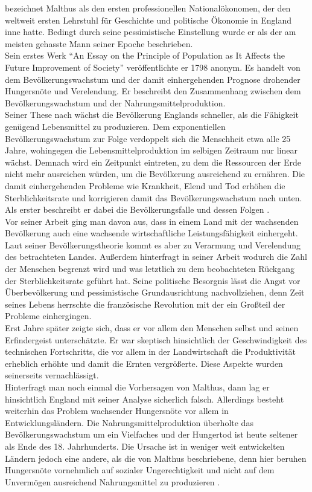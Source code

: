 \cite{Lin.2007} bezeichnet Malthus als den ersten professionellen Nationalökonomen, der den weltweit ersten Lehrstuhl für Geschichte und politische Ökonomie in England inne hatte. Bedingt durch seine pessimistische Einstellung wurde er als der am meisten gehasste Mann seiner Epoche beschrieben. \\
%
Sein erstes Werk "`An Essay on the Principle of Population as It Affects the Future Improvement of Society"' veröffentlichte er 1798 anonym. Es handelt von dem Bevölkerungswachstum und der damit einhergehenden Prognose drohender Hungersnöte und Verelendung. Er beschreibt den Zusammenhang zwischen dem Bevölkerungswachstum und der Nahrungsmittelproduktion.\\
%
Seiner These nach wächst die Bevölkerung Englands schneller, als die Fähigkeit genügend Lebensmittel zu produzieren. Dem exponentiellen Bevölkerungswachstum zur Folge verdoppelt sich die Menschheit etwa alle 25 Jahre, wohingegen die Lebensmittelproduktion im selbigen Zeitraum nur linear wächst. Demnach wird ein Zeitpunkt eintreten, zu dem die Ressourcen der Erde nicht mehr ausreichen würden, um die Bevölkerung ausreichend zu ernähren. Die damit einhergehenden Probleme wie Krankheit, Elend und Tod erhöhen die Sterblichkeitsrate und korrigieren damit das Bevölkerungswachstum nach unten. Als erster beschreibt er dabei die Bevölkerungsfalle und dessen Folgen \cite{Malthus.1798}. \\

Vor seiner Arbeit ging man davon aus, dass in einem Land mit der wachsenden Bevölkerung auch eine wachsende wirtschaftliche Leistungsfähigkeit einhergeht. Laut seiner Bevölkerungstheorie kommt es aber zu Verarmung und Verelendung des betrachteten Landes. Außerdem hinterfragt \cite{Malthus.1798} in seiner Arbeit wodurch die Zahl der Menschen begrenzt wird und was letztlich zu dem beobachteten Rückgang der Sterblichkeitsrate geführt hat. Seine politische Besorgnis lässt die Angst vor Überbevölkerung und pessimistische Grundausrichtung nachvollziehen, denn Zeit seines Lebens herrschte die französische Revolution mit der ein Großteil der Probleme einhergingen.\\
%
 Erst Jahre später zeigte sich, dass er vor allem den Menschen selbst und seinen Erfindergeist unterschätzte. Er war skeptisch hinsichtlich der Geschwindigkeit des technischen Fortschritts, die vor allem in der Landwirtschaft die Produktivität erheblich erhöhte und damit die Ernten vergrößerte. Diese Aspekte wurden seinerseits vernachlässigt. \\
%
 Hinterfragt man noch einmal die Vorhersagen von Malthus, dann lag er hinsichtlich England mit seiner Analyse sicherlich falsch. Allerdings besteht weiterhin das Problem wachsender Hungersnöte vor allem in Entwicklungsländern. Die Nahrungsmittelproduktion überholte das Bevölkerungswachstum um ein Vielfaches und der Hungertod ist heute seltener als Ende des 18. Jahrhunderts. Die Ursache ist in weniger weit entwickelten Ländern jedoch eine andere, als die von Malthus beschriebene, denn hier beruhen Hungersnöte vornehmlich auf sozialer Ungerechtigkeit und nicht auf dem Unvermögen ausreichend Nahrungsmittel zu produzieren \cite[S.119]{Hesselbein.2000}.

